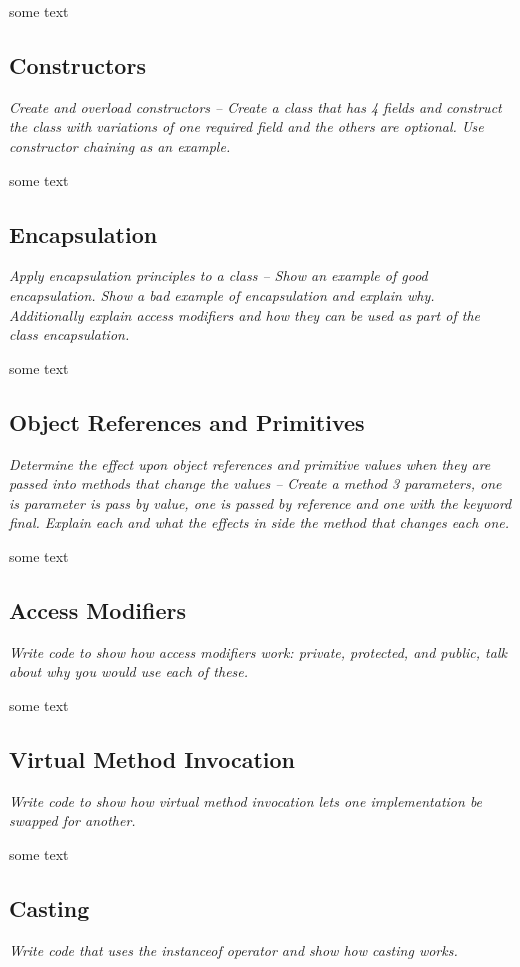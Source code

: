 \documentclass[fleqn,10pt]{SelfArx} %
\begin{document}
some text


\subsection{Constructors}
\textit{Create and overload constructors -- Create a class that has 4 fields and construct the class with variations of one required field and the others are optional.  Use constructor chaining as an example.}

some text

\subsection{Encapsulation}
\textit{Apply encapsulation principles to a class -- Show an example of good encapsulation.  Show a bad example of encapsulation and explain why.  Additionally explain access modifiers and how they can be used as part of the class encapsulation.}

some text

\subsection{Object References and Primitives}
\textit{Determine the effect upon object references and primitive values when they are passed  into methods that change the values -- Create a method 3 parameters, one is parameter is pass by value, one is passed by reference and one with the keyword final.  Explain each and what the effects in side the method that changes each one.
}

some text


\subsection{Access Modifiers}
\textit{Write code to show how access modifiers work: private, protected, and public, talk about why you would use each of these.}

some text



\subsection{Virtual Method Invocation}
\textit{Write code to show how virtual method invocation lets one implementation be swapped for another.}

some text


\subsection{Casting}
\textit{Write code that uses the instanceof operator and show how casting works.}
\end{document}
